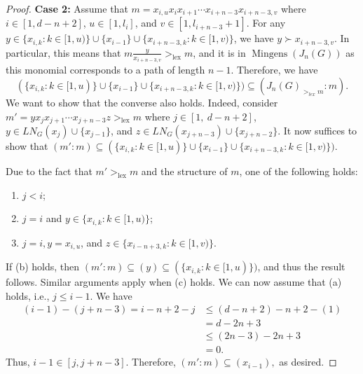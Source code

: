 \documentclass[10pt,a4paper]{amsart}
\DeclareMathOperator{\lex}{lex}
\DeclareMathOperator{\mingens}{Mingens}
\begin{document}
\begin{proof}
		\textbf{Case 2:} Assume that $m=x_{i,u}x_ix_{i+1}\cdots x_{i+n-3}x_{i+n-3,v}$ where $i\in [1, d-n+2]$, $u\in [1,l_i]$, and $v\in [1, l_{i+n-3}+1]$.    
		For any $y\in \{ x_{i,k} \colon k\in [1,u) \} \cup \{x_{i-1}\} \cup \{x_{i+n-3,k}\colon k\in [1,v)\}$, we have $y\succ x_{i+n-3,v}$. In particular, this means that  $m\frac{y}{x_{i+n-3,v}} >_{\lex} m$, and it is in $\mingens(J_n(G))$ as this monomial corresponds to a path of length $n-1$. Therefore, we have 
		\[
		(\{ x_{i,k} \colon k\in [1,u) \} \cup \{x_{i-1}\} \cup \{x_{i+n-3,k}\colon k\in [1,v)\}) \subseteq (J_n(G)_{>_{lex}m} \colon m).
		\]
		We want to show that the converse also holds. Indeed, consider $m'=yx_jx_{j+1}\cdots x_{j+n-3}z>_{\lex}  m$ where $j\in [1,\ d-n+2]$, $y\in LN_G(x_j)\cup \{x_{j-1}\}$, and $z\in  LN_G(x_{j+n-3})\cup \{x_{j+n-2}\}$. It now suffices to show that $(m':m)\subseteq (\{ x_{i,k} \colon k\in [1,u) \} \cup \{x_{i-1}\} \cup \{x_{i+n-3,k}\colon k\in [1,v)\})$.
		
		Due to the fact that $m'>_{\lex}  m$ and the structure of $m$, one of the following holds:
		\begin{enumerate}
			\item[(a)] $j<i$;
			\item[(b)] $j=i$ and $y\in \{ x_{i,k}\colon k\in [1,u)\}$;
			\item[(c)] $j=i, y=x_{i,u}$, and $z\in \{x_{i-n+3,k}\colon k\in [1,v)\}$. 
		\end{enumerate}
		If (b) holds, then $(m'\colon m)\subseteq (y)\subseteq (\{ x_{i,k}\colon k\in [1,u)\})$, and thus the result follows. Similar arguments apply when (c) holds. We can now assume that (a) holds, i.e., $j\leq i-1$. We have 
		\begin{align*}
			(i-1)-(j+n-3) = i-n+2-j &\leq (d-n+2) -n+2-(1) \\
			&= d-2n+3\\
			&\leq (2n-3)-2n+3\\
			&=0.        
		\end{align*}
		Thus, $i-1\in [j,j+n-3]$. Therefore, $(m'\colon m)\subseteq (x_{i-1}),$ as desired. 
	\end{proof}
\end{document}
